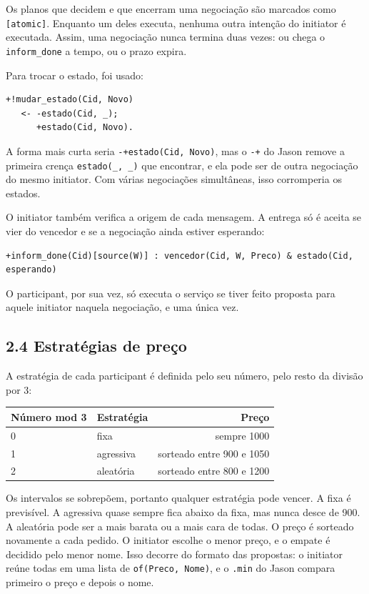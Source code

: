 \documentclass[11pt,a4paper]{article}
\newcommand{\cod}[1]{\texttt{#1}}
\begin{document}
Os planos que decidem e que encerram uma negociação são marcados como \cod{[atomic]}. Enquanto um deles executa, nenhuma outra intenção do initiator é executada. Assim, uma negociação nunca termina duas vezes: ou chega o \cod{inform\_done} a tempo, ou o prazo expira.

Para trocar o estado, foi usado:

\begin{lstlisting}
+!mudar_estado(Cid, Novo)
   <- -estado(Cid, _);
      +estado(Cid, Novo).
\end{lstlisting}

A forma mais curta seria \cod{-+estado(Cid, Novo)}, mas o \cod{-+} do Jason remove a primeira crença \cod{estado(\_, \_)} que encontrar, e ela pode ser de outra negociação do mesmo initiator. Com várias negociações simultâneas, isso corromperia os estados.

O initiator também verifica a origem de cada mensagem. A entrega só é aceita se vier do vencedor e se a negociação ainda estiver esperando:

\begin{lstlisting}
+inform_done(Cid)[source(W)] : vencedor(Cid, W, Preco) & estado(Cid, esperando)
\end{lstlisting}

O participant, por sua vez, só executa o serviço se tiver feito proposta para aquele initiator naquela negociação, e uma única vez.

\subsection*{2.4 Estratégias de preço}

A estratégia de cada participant é definida pelo seu número, pelo resto da divisão por 3:

\begin{center}
\begin{tabular}{llr}
\toprule
Número mod 3 & Estratégia & Preço \\
\midrule
0 & fixa & sempre 1000 \\
1 & agressiva & sorteado entre 900 e 1050 \\
2 & aleatória & sorteado entre 800 e 1200 \\
\bottomrule
\end{tabular}
\end{center}

Os intervalos se sobrepõem, portanto qualquer estratégia pode vencer. A fixa é previsível. A agressiva quase sempre fica abaixo da fixa, mas nunca desce de 900. A aleatória pode ser a mais barata ou a mais cara de todas. O preço é sorteado novamente a cada pedido. O initiator escolhe o menor preço, e o empate é decidido pelo menor nome. Isso decorre do formato das propostas: o initiator reúne todas em uma lista de \cod{of(Preco, Nome)}, e o \cod{.min} do Jason compara primeiro o preço e depois o nome.
\end{document}
